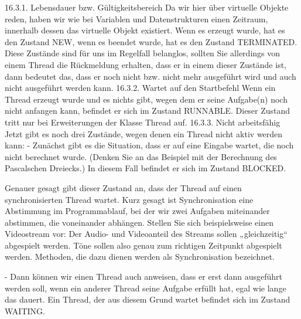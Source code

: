 16.3.1.	Lebensdauer bzw. Gültigkeitsbereich
Da wir hier über virtuelle Objekte reden, haben wir wie bei Variablen und Datenstrukturen einen Zeitraum, innerhalb dessen das virtuelle Objekt existiert. Wenn es erzeugt wurde, hat es den Zustand NEW, wenn es beendet wurde, hat es den Zustand TERMINATED.
Diese Zustände sind für uns im Regelfall belanglos, sollten Sie allerdings von einem Thread die Rückmeldung erhalten, dass er in einem dieser Zustände ist, dann bedeutet das, dass er noch nicht bzw. nicht mehr ausgeführt wird und auch nicht ausgeführt werden kann.
16.3.2.	Wartet auf den Startbefehl
Wenn ein Thread erzeugt wurde und es nichts gibt, wegen dem er seine Aufgabe(n) noch nicht anfangen kann, befindet er sich im Zustand RUNNABLE. Dieser Zustand tritt nur bei Erweiterungen der Klasse Thread auf.
16.3.3.	Nicht arbeitsfähig
Jetzt gibt es noch drei Zustände, wegen denen ein Thread nicht aktiv werden kann:
-	Zunächst gibt es die Situation, dass er auf eine Eingabe wartet, die noch nicht berechnet wurde. (Denken Sie an das Beispiel mit der Berechnung des Pascalschen Dreiecks.) In diesem Fall befindet er sich im Zustand BLOCKED. 

Genauer gesagt gibt dieser Zustand an, dass der Thread auf einen synchronisierten Thread wartet. Kurz gesagt ist Synchronisation eine Abstimmung im Programmablauf, bei der wir zwei Aufgaben miteinander abstimmen, die voneinander abhängen. Stellen Sie sich beispielsweise einen Videostream vor: Der Audio- und Videoanteil des Streams sollen „gleichzeitig“ abgespielt werden. Töne sollen also genau zum richtigen Zeitpunkt abgespielt werden. Methoden, die dazu dienen werden als Synchronisation bezeichnet.

-	Dann können wir einen Thread auch anweisen, dass er erst dann ausgeführt werden soll, wenn ein anderer Thread seine Aufgabe erfüllt hat, egal wie lange das dauert. Ein Thread, der aus diesem Grund wartet befindet sich im Zustand WAITING.

